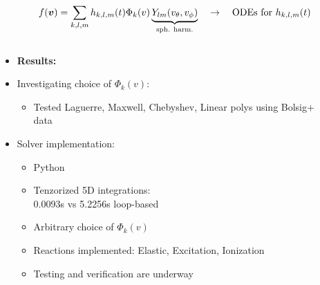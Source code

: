\documentclass[mathserif, aspectratio=169]{beamer}
\newcommand{\vect}[1]{\boldsymbol{#1}}
\newcommand{\of}[1]{\mleft( #1 \mright)}
\newcommand{\vth}{v_{\textrm{th}}}
\begin{document}
\begin{frame}
{\begin{columns}[T]
\begin{column}{.71\linewidth}
\begin{itemize}
\begin{itemize}
\begin{align*}
f\of{\vect{v}}
=
\sum_{k,l,m} h_{k,l,m} \of{t} \Phi_k\of{v} \underbrace{Y_{lm}\of{v_\theta, v_\phi}}_{\tiny\text{sph. harm.}}
\quad \rightarrow \quad \text{ODEs for } h_{k,l,m} \of{t}
\end{align*}
\end{itemize}
\end{itemize}
\begin{columns}[T]
\begin{column}{.5\linewidth}
\begin{itemize}
\item[] \textbf{Results:}
\item Investigating choice of $\Phi_k(v)$:
\begin{itemize}
\item Tested Laguerre, Maxwell, Chebyshev, Linear polys using Bolsig+ data
\end{itemize}
\item Solver implementation:
\begin{itemize}
\item Python
\item Tenzorized 5D integrations: \\0.0093s vs 5.2256s loop-based
\item Arbitrary choice of $\Phi_k(v)$
\item Reactions implemented:
Elastic, Excitation, Ionization
\item Testing and verification are underway
\end{itemize}
\end{itemize}
\end{column}
\begin{column}{.5\linewidth}
\begin{center}

\end{center}
\end{column}
\end{columns}
\end{column}
\end{columns}}
\end{frame}
\end{document}
